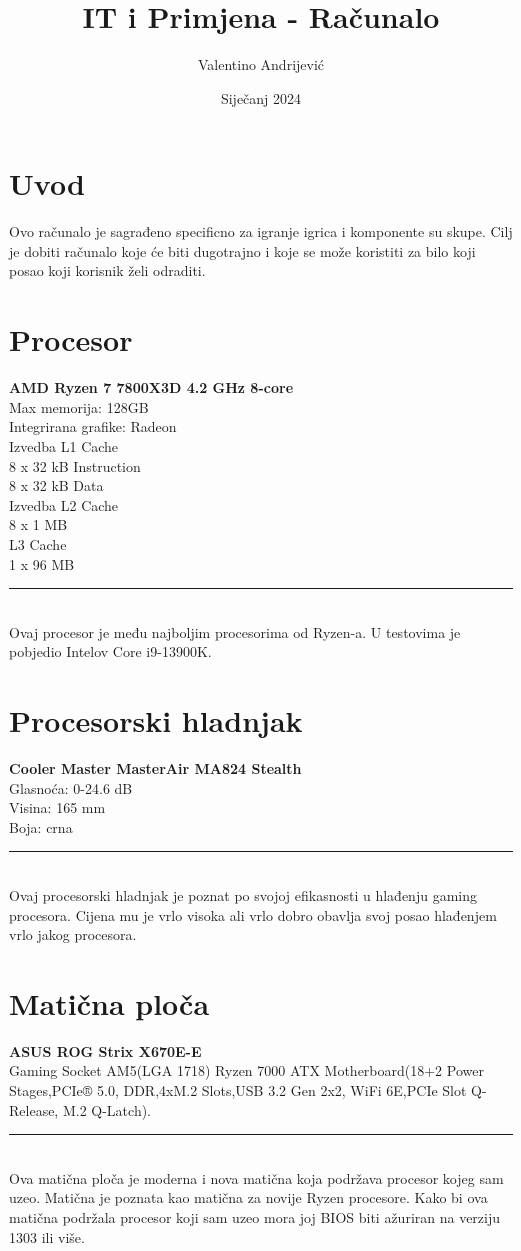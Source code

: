 \documentclass{article}
\title{IT i Primjena - Računalo}
\author{Valentino Andrijević}
\date{Siječanj 2024}
\begin{document}
\maketitle
\section{Uvod}
Ovo računalo je sagrađeno specificno za igranje igrica i komponente su skupe. Cilj je dobiti računalo koje
će biti dugotrajno i koje se može koristiti za bilo koji posao koji korisnik želi odraditi.

\section{Procesor}
\textbf{AMD Ryzen 7 7800X3D 4.2 GHz 8-core}
\\ Max memorija: 128GB
\\ Integrirana grafike: Radeon
\\ Izvedba L1 Cache
\\ 8 x 32 kB Instruction
\\ 8 x 32 kB Data
\\ Izvedba L2 Cache
\\ 8 x 1 MB
\\ L3 Cache
\\ 1 x 96 MB
\\ \rule{\textwidth}{0.5pt}
\\ Ovaj procesor je među najboljim procesorima od Ryzen-a.
U testovima je pobjedio Intelov Core i9-13900K.

\section{Procesorski hladnjak}
\textbf{Cooler Master MasterAir MA824 Stealth}
\\ Glasnoća: 0-24.6 dB
\\ Visina: 165 mm
\\ Boja: crna
\\ \rule{\textwidth}{0.5pt}
\\ Ovaj procesorski hladnjak je poznat po svojoj efikasnosti u hlađenju gaming procesora.
Cijena mu je vrlo visoka ali vrlo dobro obavlja svoj posao hlađenjem vrlo jakog procesora.

\section{Matična ploča}
\textbf{ASUS ROG Strix X670E-E}
\\ Gaming Socket AM5(LGA 1718) Ryzen 7000 ATX Motherboard(18+2 Power Stages,PCIe® 5.0, DDR,4xM.2 Slots,USB 3.2 Gen 2x2, WiFi 6E,PCIe Slot Q-Release, M.2 Q-Latch).
\\ \rule{\textwidth}{0.5pt}
\\ Ova matična ploča je moderna i nova matična koja podržava procesor kojeg sam uzeo. Matična je poznata kao matična za novije Ryzen procesore. Kako bi ova matična podržala procesor koji sam uzeo mora joj BIOS biti ažuriran na verziju 1303 ili više.
\end{document}
